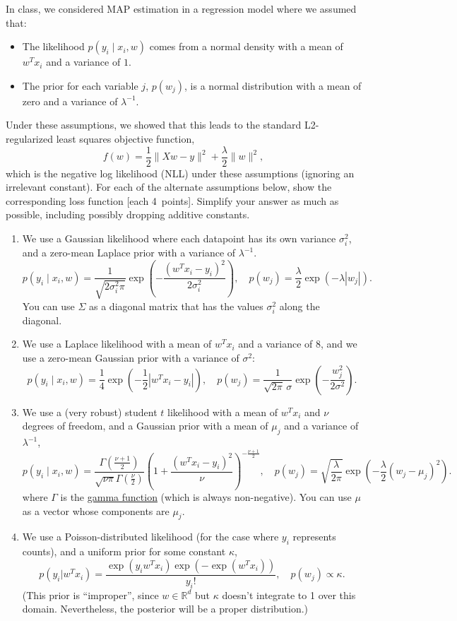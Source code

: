 \documentclass{article}
\newcommand{\blu}[1]{{\textcolor{blu}{#1}}}
\let\ask\blu
\newcommand\pts[1]{\textcolor{pointscolour}{[#1~points]}}
\def\R{\mathbb{R}}
\newcommand{\norm}[1]{\lVert #1 \rVert}
\begin{document}
In class, we considered MAP estimation in a regression model where we assumed that:
\begin{itemize}
\item The likelihood $p(y_i \mid x_i, w)$ comes from a normal density with a mean of $w^Tx_i$ and a variance of $1$.
\item The prior for each variable $j$, $p(w_j)$, is a normal distribution with a mean of zero and a variance of $\lambda^{-1}$.
\end{itemize}
Under these assumptions, we showed that this leads to the standard L2-regularized least squares objective function,
\[
f(w) = \frac{1}{2}\norm{Xw - y}^2 + \frac \lambda 2 \norm{w}^2,
\]
which is the negative log likelihood (NLL) under these assumptions (ignoring an irrelevant constant).
\ask{For each of the alternate assumptions below, show the corresponding loss function} \pts{each 4}. Simplify your answer as much as possible, including possibly dropping additive constants.
\begin{enumerate}

\item We use a Gaussian likelihood where each datapoint has its own variance $\sigma_i^2$, and a zero-mean Laplace prior with a variance of $\lambda^{-1}$.
\[
p(y_i \mid x_i,w) = \frac{1}{\sqrt{2\sigma_i^2\pi}}\exp\left(-\frac{(w^Tx_i - y_i)^2}{2\sigma_i^2}\right), \quad p(w_j) = \frac{\lambda}{2}\exp(-\lambda|w_j|).
\]
You can use $\Sigma$ as a diagonal matrix that has the values $\sigma_i^2$ along the diagonal.

\item We use a Laplace likelihood with a mean of $w^Tx_i$ and a variance of $8$, and we use a zero-mean Gaussian prior with a variance of $\sigma^2$:
\[
p(y_i \mid x_i, w) = \frac14 \exp\left(- \frac12 |w^Tx_i - y_i| \right), \quad
p(w_j) = \frac{1}{\sqrt{2\pi} \, \sigma} \exp\left(-\frac{w_j^2}{2\sigma^2} \right).
\]


 \item We use a (very robust) student $t$ likelihood with a mean of $w^Tx_i$ and $\nu$ degrees of freedom, and a Gaussian prior with a mean of $\mu_j$ and a variance of $\lambda^{-1}$,
\[
  p(y_i \mid x_i, w) = \frac{\Gamma\left(\frac{\nu + 1}{2}\right)}{\sqrt{\nu\pi}\Gamma\left(\frac \nu 2\right)}
                       \left(1 + \frac{(w^T x_i - y_i)^2}{\nu} \right)^{-\frac{\nu+1}{2}}
, \quad
  p(w_j) = \sqrt{\frac{\lambda}{2\pi}} \exp\left( -\frac\lambda2 (w_j - \mu_j)^2 \right).
\]
where $\Gamma$ is the \href{https://en.wikipedia.org/wiki/Gamma_function}{gamma function} (which is always non-negative).
You can use $\mu$ as a vector whose components are $\mu_j$.

\item We use a Poisson-distributed likelihood (for the case where $y_i$ represents counts), and a uniform prior for some constant $\kappa$,
\[
p(y_i | w^Tx_i) = \frac{\exp(y_iw^Tx_i)\exp(-\exp(w^Tx_i))}{y_i!}, \quad p(w_j) \propto \kappa.
\]
(This prior is 	``improper'', since $w\in\R^d$ but $\kappa$ doesn't integrate to 1 over this domain. Nevertheless, the posterior will be a proper distribution.)
\end{enumerate}
\end{document}
